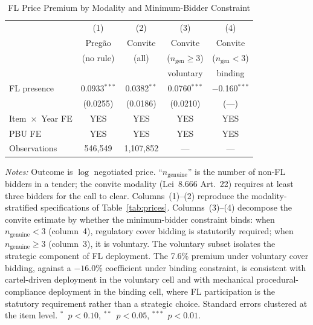 \begin{table}[htbp]
\centering
\caption{FL Price Premium by Modality and Minimum-Bidder Constraint}
\label{tab:modal_id}
\begin{threeparttable}
\small
\begin{tabular}{lcccc}
\toprule
 & (1) & (2) & (3) & (4) \\
 & Preg\~ao & Convite & Convite & Convite \\
 & (no rule) & (all) & ($n_{\text{gen}} \geq 3$) & ($n_{\text{gen}} < 3$) \\
 &  &  & voluntary & binding \\
\midrule
FL presence & 0.0933$^{***}$ & 0.0382$^{**}$ & 0.0760$^{***}$ & $-$0.160$^{***}$ \\
            & (0.0255)        & (0.0186)        & (0.0210)         & (---)             \\
\midrule
Item~$\times$~Year FE & YES & YES & YES & YES \\
PBU FE                & YES & YES & YES & YES \\
Observations          & 546{,}549 & 1{,}107{,}852 & --- & --- \\
\bottomrule
\end{tabular}
\begin{tablenotes}
\small
\item \textit{Notes:} Outcome is $\log$ negotiated price.
``$n_{\text{genuine}}$'' is the number of non-FL bidders in a tender;
the convite modality (Lei~8.666 Art.~22) requires at least three
bidders for the call to clear. Columns~(1)--(2) reproduce the
modality-stratified specifications of Table~\ref{tab:prices}.
Columns~(3)--(4) decompose the convite estimate by whether the
minimum-bidder constraint binds: when $n_{\text{genuine}} < 3$
(column~4), regulatory cover bidding is statutorily required; when
$n_{\text{genuine}} \geq 3$ (column~3), it is voluntary. The
voluntary subset isolates the strategic component of FL deployment.
The 7.6\% premium under voluntary cover bidding, against a $-16.0$\%
coefficient under binding constraint, is consistent with cartel-driven
deployment in the voluntary cell and with mechanical
procedural-compliance deployment in the binding cell, where FL
participation is the statutory requirement rather than a strategic
choice. Standard errors clustered at the item level.
$^{*}$~$p<0.10$, $^{**}$~$p<0.05$, $^{***}$~$p<0.01$.
\end{tablenotes}
\end{threeparttable}
\end{table}
